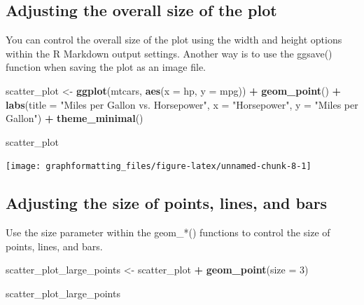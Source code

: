 \documentclass[
]{book}
\newenvironment{Shaded}{\begin{snugshade}}{\end{snugshade}}
\newcommand{\AttributeTok}[1]{\textcolor[rgb]{0.13,0.29,0.53}{#1}}
\newcommand{\DecValTok}[1]{\textcolor[rgb]{0.00,0.00,0.81}{#1}}
\newcommand{\FunctionTok}[1]{\textcolor[rgb]{0.13,0.29,0.53}{\textbf{#1}}}
\newcommand{\NormalTok}[1]{#1}
\newcommand{\OtherTok}[1]{\textcolor[rgb]{0.56,0.35,0.01}{#1}}
\newcommand{\SpecialCharTok}[1]{\textcolor[rgb]{0.81,0.36,0.00}{\textbf{#1}}}
\newcommand{\StringTok}[1]{\textcolor[rgb]{0.31,0.60,0.02}{#1}}
\begin{document}
\hypertarget{adjusting-the-overall-size-of-the-plot}{%
\subsection{Adjusting the overall size of the plot}\label{adjusting-the-overall-size-of-the-plot}}

You can control the overall size of the plot using the width and height options within the R Markdown output settings. Another way is to use the ggsave() function when saving the plot as an image file.

\begin{Shaded}
\begin{Highlighting}[]
\NormalTok{scatter\_plot }\OtherTok{\textless{}{-}} \FunctionTok{ggplot}\NormalTok{(mtcars, }\FunctionTok{aes}\NormalTok{(}\AttributeTok{x =}\NormalTok{ hp, }\AttributeTok{y =}\NormalTok{ mpg)) }\SpecialCharTok{+}
  \FunctionTok{geom\_point}\NormalTok{() }\SpecialCharTok{+}
  \FunctionTok{labs}\NormalTok{(}\AttributeTok{title =} \StringTok{"Miles per Gallon vs. Horsepower"}\NormalTok{,}
       \AttributeTok{x =} \StringTok{"Horsepower"}\NormalTok{,}
       \AttributeTok{y =} \StringTok{"Miles per Gallon"}\NormalTok{) }\SpecialCharTok{+}
  \FunctionTok{theme\_minimal}\NormalTok{()}

\NormalTok{scatter\_plot}
\end{Highlighting}
\end{Shaded}

\texttt{[image: graphformatting\_files/figure-latex/unnamed-chunk-8-1]}

\hypertarget{adjusting-the-size-of-points-lines-and-bars}{%
\subsection{Adjusting the size of points, lines, and bars}\label{adjusting-the-size-of-points-lines-and-bars}}

Use the size parameter within the geom\_*() functions to control the size of points, lines, and bars.

\begin{Shaded}
\begin{Highlighting}[]
\NormalTok{scatter\_plot\_large\_points }\OtherTok{\textless{}{-}}\NormalTok{ scatter\_plot }\SpecialCharTok{+}
  \FunctionTok{geom\_point}\NormalTok{(}\AttributeTok{size =} \DecValTok{3}\NormalTok{)}

\NormalTok{scatter\_plot\_large\_points}
\end{Highlighting}
\end{Shaded}
\end{document}
